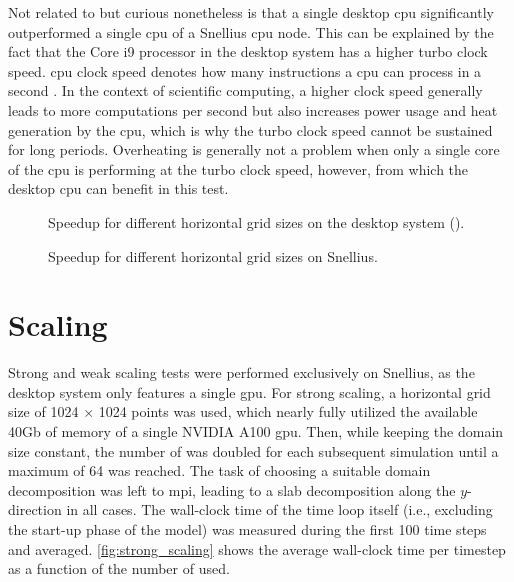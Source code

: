 Not related to  but curious nonetheless is that a single desktop \acrshort{cpu} significantly outperformed a single \acrshort{cpu} of a Snellius \acrshort{cpu} node. This can be explained by the fact that the Core i9 processor in the desktop system has a higher turbo clock speed. \acrshort{cpu} clock speed denotes how many instructions a \acrshort{cpu} can process in a second . In the context of scientific computing, a higher clock speed generally leads to more computations per second but also increases power usage and heat generation by the \acrshort{cpu}, which is why the turbo clock speed cannot be sustained for long periods. Overheating is generally not a problem when only a single core of the \acrshort{cpu} is performing at the turbo clock speed, however, from which the desktop \acrshort{cpu} can benefit in this test.

\begin{figure}[h!]
    \centering
    
    \caption{Speedup for different horizontal grid sizes on the desktop system ().}
    \label{fig:speedup_desktop}
\end{figure}

\begin{figure}[h!]
    \centering
    
    \caption{Speedup for different horizontal grid sizes on Snellius.}
    \label{fig:speedup_snellius}
\end{figure}

\section{Scaling}
Strong and weak scaling tests were performed exclusively on Snellius, as the desktop system only features a single \acrshort{gpu}. For strong scaling, a horizontal grid size of 1024 $\times$ 1024 points was used, which nearly fully utilized the available 40Gb of memory of a single NVIDIA A100 \acrshort{gpu}. Then, while keeping the domain size constant, the number of  was doubled for each subsequent simulation until a maximum of 64  was reached. The task of choosing a suitable domain decomposition was left to \acrshort{mpi}, leading to a slab decomposition along the $y$-direction in all cases. The wall-clock time of the time loop itself (i.e., excluding the start-up phase of the model) was measured during the first 100 time steps and averaged. \autoref{fig:strong_scaling} shows the average wall-clock time per timestep as a function of the number of  used. 

